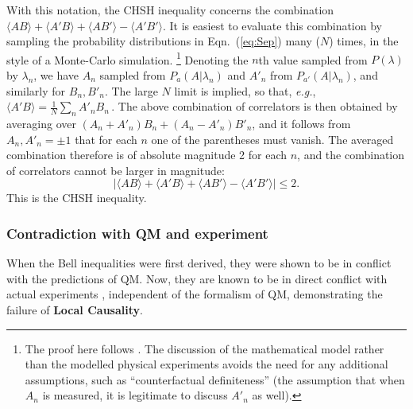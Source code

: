 \documentclass[onecolumn, nofootinbib, 12pt]{revtex4-1}
\begin{document}
With this notation, the CHSH inequality concerns the combination
$\langle A B \rangle + \langle A' B \rangle + \langle A B' \rangle - \langle A' B' \rangle$.  It is easiest to evaluate this combination by sampling the probability distributions in Eqn.~(\ref{eq:Sep}) many ($N$) times, in the style of a Monte-Carlo simulation.%
\footnote{The proof here follows \textcite{peres1978}.  The discussion of the mathematical model rather than the modelled physical experiments avoids the need for any additional assumptions, such as ``counterfactual definiteness'' (the assumption that when $A_n$ is measured, it is legitimate to discuss $A'_n$ as well).}
Denoting the $n$th value sampled from $P(\lambda)$ by $\lambda_n$, we have $A_n$ sampled from $P_a(A|\lambda_n)$ and $A'_n$ from $P_{a'}(A|\lambda_n)$, and similarly for $B_n, B'_n$.
The large $N$ limit is implied, so that, \emph{e.g.}, 
$\langle A' B \rangle = \frac{1}{N} \sum_n A'_n B_n \,$.
The above combination of correlators is then obtained by averaging over 
$(A_n + A'_n) B_n + (A_n - A'_n) B'_n$, and it follows from $A_n, A'_n = \pm 1$ that for each $n$ one of the parentheses must vanish.  The averaged combination therefore is of absolute magnitude 2 for each $n$, and the combination of correlators cannot be larger in magnitude:
\begin{equation}
\label{eq:CHSH}
\left | \langle A B \rangle + \langle A' B \rangle + \langle A B' \rangle - \langle A' B' \rangle \right | \le 2.
\end{equation}
This is the CHSH inequality.

\subsubsection{Contradiction with QM and experiment}
\label{sec:contra}

When the Bell inequalities were first derived, they were shown to be in conflict with the predictions of QM\@.  Now, they are known to be in direct conflict with actual experiments \cite{hensen2015,giustina2015,shalm2015,rosenfeld2017}, independent of the formalism of QM, demonstrating the failure of {\bf Local Causality}.
\end{document}
